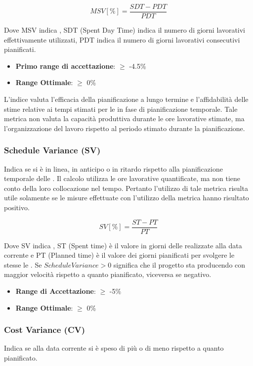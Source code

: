 \documentclass[12pt,a4paper]{article}
\begin{document}
\[MSV [\%] = \frac{SDT - PDT}{PDT}\]

Dove  MSV indica , SDT (Spent Day Time) indica il numero di giorni lavorativi effettivamente utilizzati, PDT indica il numero di giorni lavorativi consecutivi pianificati.

\begin{itemize}
	\item \textbf{Primo range di accettazione}: $\geq$ -4.5\%
	\item \textbf{Range Ottimale}: $\geq$ 0\%
\end{itemize}

L'indice  valuta l'efficacia della pianificazione a lungo termine e l'affidabilità delle stime relative ai tempi stimati per le   in fase di pianificazione temporale. Tale metrica non valuta la capacità produttiva durante le ore lavorative stimate, ma l'organizzazione del lavoro rispetto al periodo stimato durante la pianificazione.

\subsubsection{Schedule Variance (SV)} \label{schedule_variance}
Indica se si è in linea, in anticipo o in ritardo rispetto alla pianificazione temporale delle . Il calcolo utilizza le ore lavorative quantificate, ma non tiene conto della loro collocazione nel tempo. Pertanto l'utilizzo di tale metrica risulta utile solamente se le misure effettuate con l'utilizzo della metrica  hanno risultato positivo.

\[SV [\%] = \frac{ST - PT}{PT}\]

Dove SV indica  , ST (Spent time) è il valore in giorni delle   realizzate alla data corrente e PT (Planned time) è il valore dei giorni pianificati per svolgere le stesse le . Se $ScheduleVariance > 0$ significa che il progetto sta producendo con maggior velocità rispetto a quanto pianificato, viceversa se negativo.

\begin{itemize}
\item \textbf{Range di Accettazione}: $\geq$ -5\%
\item \textbf{Range Ottimale}: $\geq$ 0\%
\end{itemize}

\subsubsection{Cost Variance (CV)}
Indica se alla data corrente si è speso di più o di meno rispetto a quanto pianificato.
\end{document}
